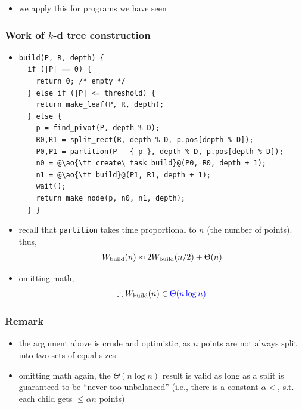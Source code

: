 \documentclass[12pt,dvipdfmx]{beamer}
\newcommand{\ao}[1]{{\color{blue}#1}}
\begin{document}
\begin{frame}[fragile]
\begin{itemize}
\item we apply this for programs we have seen
\end{itemize}
\end{frame}


\begin{frame}[fragile]
\frametitle{Work of $k$-d tree construction}
\begin{itemize}
\item []
\begin{lstlisting}
build(P, R, depth) {
  if (|P| == 0) {
    return 0; /* empty */
  } else if (|P| <= threshold) {
    return make_leaf(P, R, depth);
  } else {
    p = find_pivot(P, depth % D);
    R0,R1 = split_rect(R, depth % D, p.pos[depth % D]);
    P0,P1 = partition(P - { p }, depth % D, p.pos[depth % D]);
    n0 = @\ao{\tt create\_task build}@(P0, R0, depth + 1);
    n1 = @\ao{\tt build}@(P1, R1, depth + 1);
    wait();
    return make_node(p, n0, n1, depth);
  } }
\end{lstlisting}

\item []
  recall that {\tt partition}
  takes time proportional to $n$ (the number of points). thus, 
\[
\begin{array}{l}
W_{\mbox{\scriptsize build}}(n)
\approx 2W_{\mbox{\scriptsize build}}(n/2) + \Theta(n) \\
\end{array}
\]

\item [] omitting math,
\[ \therefore W_{\mbox{\scriptsize build}}(n) \in \ao{\Theta(n \log n)} \]
\end{itemize}
\end{frame}

\begin{frame}
\frametitle{Remark}
\begin{itemize}
\item the argument above is crude and optimistic, as $n$
  points are not always split into two sets of
  equal sizes

\item omitting math again, the $\Theta(n \log n)$ result is valid as
  long as a split is guaranteed to be ``never too
  unbalanced'' (i.e., there is a constant $\alpha
  < $, s.t. each child gets $\leq \alpha n$
  points)
\end{itemize}
\end{frame}
\end{document}

